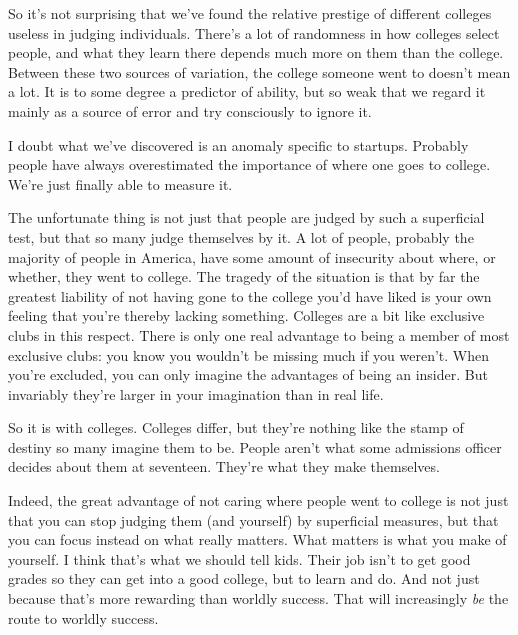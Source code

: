 So it's
                  not surprising that we've found the relative prestige of
                  different colleges useless in judging individuals. There's a
                  lot of randomness in how colleges select people, and what they
                  learn there depends much more on them than the college.
                  Between these two sources of variation, the college someone
                  went to doesn't mean a lot. It is to some degree a predictor
                  of ability, but so weak that we regard it mainly as a source
                  of error and try consciously to ignore it.

I doubt
                  what we've discovered is an anomaly specific to startups.
                  Probably people have always overestimated the importance of
                  where one goes to college. We're just finally able to measure
                  it.

The unfortunate thing is not just that people
                  are judged by such a superficial test, but that so many judge
                  themselves by it. A lot of people, probably the majority of
                  people in America, have some amount of insecurity about where,
                  or whether, they went to college. The tragedy of the situation
                  is that by far the greatest liability of not having gone to
                  the college you'd have liked is your own feeling that you're
                  thereby lacking something. Colleges are a bit like exclusive
                  clubs in this respect. There is only one real advantage to
                  being a member of most exclusive clubs: you know you wouldn't
                  be missing much if you weren't. When you're excluded, you can
                  only imagine the advantages of being an insider. But
                  invariably they're larger in your imagination than in real
                  life.

So it is with colleges. Colleges differ, but
                  they're nothing like the stamp of destiny so many imagine them
                  to be. People aren't what some admissions officer decides
                  about them at seventeen. They're what they make themselves.

Indeed,
                  the great advantage of not caring where people went to college
                  is not just that you can stop judging them (and yourself) by
                  superficial measures, but that you can focus instead on what
                  really matters. What matters is what you make of yourself. I
                  think that's what we should tell kids. Their job isn't to get
                  good grades so they can get into a good college, but to learn
                  and do. And not just because that's more rewarding than
                  worldly success. That will increasingly \emph{be} the route to
                  worldly success.






